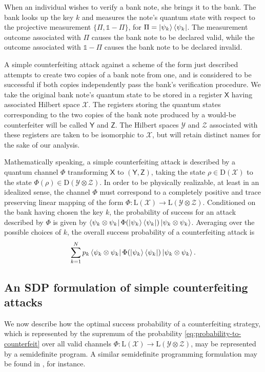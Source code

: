 \documentclass[11pt,letterpaper]{article}
\theoremstyle{definition}
\newcommand{\microspace}{\mspace{0.5mu}}
\def\I{\mathbb{1}}
\newcommand{\setft}[1]{\mathrm{#1}}
\newcommand{\lin}[1]{\setft{L}\left(#1\right)}
\newcommand{\density}[1]{\setft{D}\left(#1\right)}
\def \lket {\left|}
\def \rket {\right\rangle}
\def \lbra {\left\langle}
\def \rbra {\right|}
\newcommand{\ket}[1]{\lket\microspace #1 \microspace\rket}
\newcommand{\bra}[1]{\lbra\microspace #1 \microspace\rbra}
\newcommand{\reg}[1]{\mathsf{#1}}
\def\X{\mathcal{X}}
\def\Y{\mathcal{Y}}
\def\Z{\mathcal{Z}}
\begin{document}
When an individual wishes to verify a bank note, she brings it
to the bank.
The bank looks up the key $k$ and measures the note's quantum state
with respect to the projective measurement $\{\Pi,\I- \Pi\}$, for
$\Pi = \ket{\psi_k}\bra{\psi_k}$.
The measurement outcome associated with $\Pi$ causes the bank note to
be declared valid, while the outcome associated with $\I-\Pi$ causes
the bank note to be declared invalid.

A simple counterfeiting attack against a scheme of the form just
described attempts to create two copies of a bank note from one,
and is considered to be successful if both copies independently
pass the bank's verification procedure. 
We take the original bank note's quantum state to be stored in a
register $\reg{X}$ having associated Hilbert space $\X$.
The registers storing the quantum states corresponding to the two
copies of the bank note produced by a would-be counterfeiter will be
called $\reg{Y}$ and $\reg{Z}$.
The Hilbert spaces $\Y$ and $\Z$ associated with these registers
are taken to be isomorphic to $\X$, but will retain distinct
names for the sake of our analysis.

Mathematically speaking, a simple counterfeiting attack is described
by a quantum channel $\Phi$ transforming $\reg{X}$ to
$(\reg{Y},\reg{Z})$, taking the state $\rho\in\density{\X}$ to the
state $\Phi(\rho)\in\density{\Y\otimes\Z}$.
In order to be physically realizable, at least in an idealized sense,
the channel $\Phi$ must correspond to a completely positive and trace
preserving linear mapping of the form 
$\Phi: \lin{\X}\rightarrow\lin{\Y\otimes\Z}$.
Conditioned on the bank having chosen the key $k$, the probability of
success for an attack described by $\Phi$ is given by
$\bra{\psi_k \otimes \psi_k} \Phi(\ket{\psi_k}\bra{\psi_k})
\ket{\psi_k\otimes\psi_k}$.
Averaging over the possible choices of $k$, 
 the overall success probability of a counterfeiting
attack is
\begin{equation} 
  \label{eq:probability-to-counterfeit}
  \sum_{k = 1}^N p_k
  \bra{\psi_k \otimes \psi_k} \Phi(\ket{\psi_k}\bra{\psi_k})
  \ket{\psi_k\otimes\psi_k}.
\end{equation}

\subsection{An SDP formulation of simple counterfeiting
  attacks \label{sec:counterfeit-sdp}} 

We now describe how the optimal success probability of a
counterfeiting strategy, which is represented by the supremum of the
probability \eqref{eq:probability-to-counterfeit} over all valid
channels $\Phi:\lin{\X}\rightarrow\lin{\Y\otimes\Z}$, may be
represented by a semidefinite program.
A similar semidefinite programming formulation may be found
in \cite{AudenaertD02,CerfF06,MolinaW11}, for instance.
\end{document}
